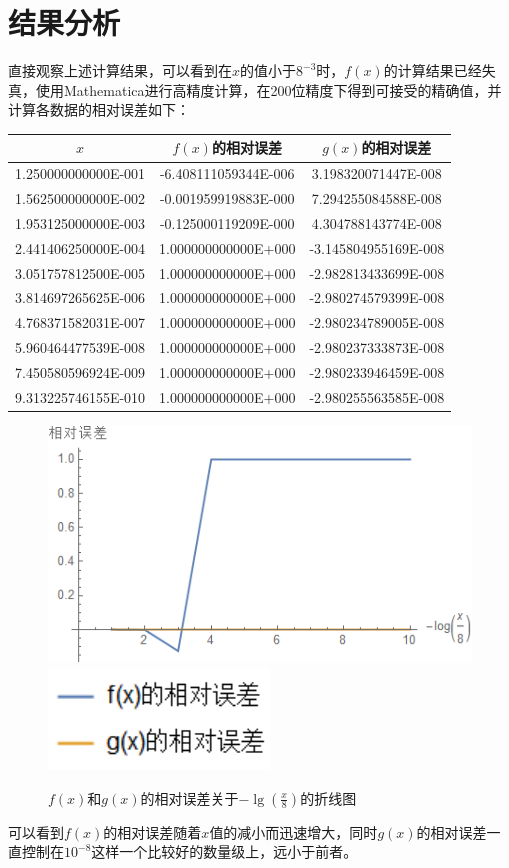\documentclass[11pt]{article}
\begin{document}
\section{结果分析}
直接观察上述计算结果，可以看到在$x$的值小于$8^{-3}$时，$f(x)$的计算结果已经失真，使用Mathematica进行高精度计算，在200位精度下得到可接受的精确值，并计算各数据的相对误差如下：
\begin{table}[h]
    \centering
    \begin{tabular}{|c|c|c|}
        \hline
        $x$                 & $f(x)$的相对误差     & $g(x)$的相对误差     \\ \hline
        1.250000000000E-001 & -6.408111059344E-006 & 3.198320071447E-008  \\ \hline
        1.562500000000E-002 & -0.001959919883E-000 & 7.294255084588E-008  \\ \hline
        1.953125000000E-003 & -0.125000119209E-000 & 4.304788143774E-008  \\ \hline
        2.441406250000E-004 & 1.000000000000E+000  & -3.145804955169E-008 \\ \hline
        3.051757812500E-005 & 1.000000000000E+000  & -2.982813433699E-008 \\ \hline
        3.814697265625E-006 & 1.000000000000E+000  & -2.980274579399E-008 \\ \hline
        4.768371582031E-007 & 1.000000000000E+000  & -2.980234789005E-008 \\ \hline
        5.960464477539E-008 & 1.000000000000E+000  & -2.980237333873E-008 \\ \hline
        7.450580596924E-009 & 1.000000000000E+000  & -2.980233946459E-008 \\ \hline
        9.313225746155E-010 & 1.000000000000E+000  & -2.980255563585E-008 \\ \hline
    \end{tabular}
\end{table}
\begin{figure}
    \centering
    \includegraphics[width = 0.7\columnwidth]{./Question1/Part1_RelativeError.png}
    \includegraphics[width = 0.2\columnwidth]{./Question1/Part1_RelativeError_Example.png}
    \caption{$f(x)$和$g(x)$的相对误差关于$-\lg{\left(\frac{x}{8}\right)}$的折线图}
\end{figure}
可以看到$f(x)$的相对误差随着$x$值的减小而迅速增大，同时$g(x)$的相对误差一直控制在$10^{-8}$这样一个比较好的数量级上，远小于前者。
\end{document}
